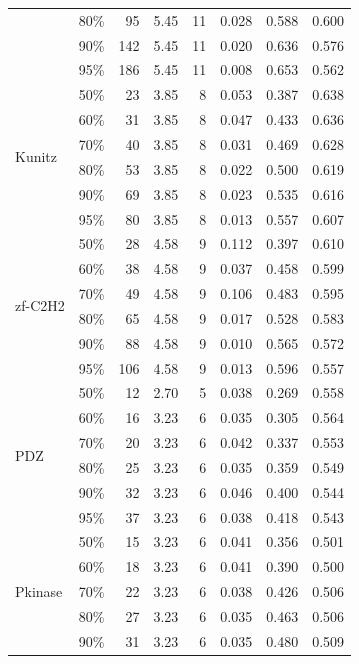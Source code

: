 \begin{table}[p]
\begin{tabular}{@{}llrrrrcc@{}}
 & 80\% &  95 & 5.45 & 11 & 0.028 & 0.588 & 0.600 \\
 & 90\% & 142 & 5.45 & 11 & 0.020 & 0.636 & 0.576 \\
 & 95\% & 186 & 5.45 & 11 & 0.008 & 0.653 & 0.562 \\
\midrule
\multirow{6}{*}{Kunitz}
 & 50\% &  23 & 3.85 &  8 & 0.053 & 0.387 & 0.638 \\
 & 60\% &  31 & 3.85 &  8 & 0.047 & 0.433 & 0.636 \\
 & 70\% &  40 & 3.85 &  8 & 0.031 & 0.469 & 0.628 \\
\cmidrule{2-8}
 & 80\% &  53 & 3.85 &  8 & 0.022 & 0.500 & 0.619 \\
 & 90\% &  69 & 3.85 &  8 & 0.023 & 0.535 & 0.616 \\
 & 95\% &  80 & 3.85 &  8 & 0.013 & 0.557 & 0.607 \\
\midrule
\multirow{6}{*}{zf-C2H2}
 & 50\% &  28 & 4.58 &  9 & 0.112 & 0.397 & 0.610 \\
 & 60\% &  38 & 4.58 &  9 & 0.037 & 0.458 & 0.599 \\
 & 70\% &  49 & 4.58 &  9 & 0.106 & 0.483 & 0.595 \\
\cmidrule{2-8}
 & 80\% &  65 & 4.58 &  9 & 0.017 & 0.528 & 0.583 \\
 & 90\% &  88 & 4.58 &  9 & 0.010 & 0.565 & 0.572 \\
 & 95\% & 106 & 4.58 &  9 & 0.013 & 0.596 & 0.557 \\
\midrule
\multirow{6}{*}{PDZ}
 & 50\% &  12 & 2.70 &  5 & 0.038 & 0.269 & 0.558 \\
 & 60\% &  16 & 3.23 &  6 & 0.035 & 0.305 & 0.564 \\
 & 70\% &  20 & 3.23 &  6 & 0.042 & 0.337 & 0.553 \\
\cmidrule{2-8}
 & 80\% &  25 & 3.23 &  6 & 0.035 & 0.359 & 0.549 \\
 & 90\% &  32 & 3.23 &  6 & 0.046 & 0.400 & 0.544 \\
 & 95\% &  37 & 3.23 &  6 & 0.038 & 0.418 & 0.543 \\
\midrule
\multirow{6}{*}{Pkinase}
 & 50\% &  15 & 3.23 &  6 & 0.041 & 0.356 & 0.501 \\
 & 60\% &  18 & 3.23 &  6 & 0.041 & 0.390 & 0.500 \\
 & 70\% &  22 & 3.23 &  6 & 0.038 & 0.426 & 0.506 \\
\cmidrule{2-8}
 & 80\% &  27 & 3.23 &  6 & 0.035 & 0.463 & 0.506 \\
 & 90\% &  31 & 3.23 &  6 & 0.035 & 0.480 & 0.509 \\

\end{tabular}
\end{table}
